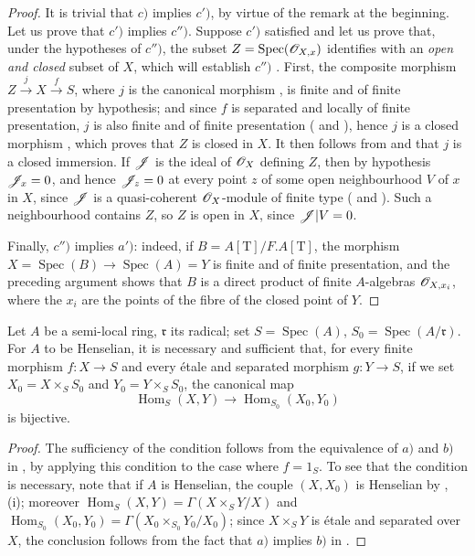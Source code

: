 \begin{proof}
It is trivial that $c)$ implies $c')$, by virtue of the remark at the beginning.
Let us prove that $c')$ implies $c'')$.
Suppose $c')$ satisfied and let us prove that, under the hypotheses of $c'')$, the subset $Z=\operatorname{Spec}(\mathscr{O}_{X,x})$ identifies with an \emph{open and closed} subset of $X$, which will establish $c'')$ .
First, the composite morphism $Z\xrightarrow{j}X\xrightarrow{f}S$, where $j$ is the canonical morphism , is finite and of finite presentation by hypothesis;
and since $f$ is separated and locally of finite presentation, $j$ is also finite and of finite presentation ( and ), hence $j$ is a closed morphism , which proves that $Z$ is closed in $X$.
It then follows from  and  that $j$ is a closed immersion.
If $\mathscr{J}$ is the ideal of $\mathscr{O}_X$ defining $Z$, then by hypothesis $\mathscr{J}_x=0$, and hence $\mathscr{J}_z=0$ at every point $z$ of some open neighbourhood $V$ of $x$ in $X$, since $\mathscr{J}$ is a quasi-coherent $\mathscr{O}_X$-module of finite type ( and ).
Such a neighbourhood contains $Z$, so $Z$ is open in $X$, since $\mathscr{J}|V=0$.

Finally, $c'')$ implies $a')$:
indeed, if $B=A[\mathrm{T}]/F.A[\mathrm{T}]$, the morphism $X=\operatorname{Spec}(B)\to\operatorname{Spec}(A)=Y$ is finite and of finite presentation, and the preceding argument shows that $B$ is a direct product of finite $A$-algebras $\mathscr{O}_{X,x_i}$, where the $x_i$ are the points of the fibre of the closed point of $Y$.
\end{proof}

\begin{corollary}[18.5.12]
\label{IV.18.5.12}
Let $A$ be a semi-local ring, $\mathfrak{r}$ its radical;
set $S=\operatorname{Spec}(A)$, $S_0=\operatorname{Spec}(A/\mathfrak{r})$.
For $A$ to be Henselian, it is necessary and sufficient that, for every finite morphism $f:X\to S$ and every \'etale and separated morphism $g:Y\to S$, if we set $X_0=X\times_S S_0$ and $Y_0=Y\times_S S_0$, the canonical map
\[
\operatorname{Hom}_S(X,Y)\to\operatorname{Hom}_{S_0}(X_0,Y_0)
\]
is bijective.
\end{corollary}

\begin{proof}
The sufficiency of the condition follows from the equivalence of $a)$ and $b)$ in , by applying this condition to the case where $f=1_S$.
To see that the condition is necessary, note that if $A$ is Henselian, the couple $(X,X_0)$ is Henselian by , (i);
moreover $\operatorname{Hom}_S(X,Y)=\Gamma(X\times_S Y/X)$ and $\operatorname{Hom}_{S_0}(X_0,Y_0)=\Gamma(X_0\times_{S_0}Y_0/X_0)$;
since $X\times_S Y$ is \'etale and separated over $X$, the conclusion follows from the fact that $a)$ implies $b)$ in .
\end{proof}

